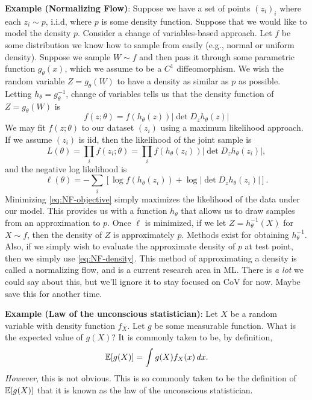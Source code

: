 \vspace{1em} \noindent 
\textbf{Example (Normalizing Flow)}: Suppose we have a set of points $(z_i)_i $ where each $z_i \sim p$, i.i.d, where $p$ is some density function. Suppose that we would like to model the density $p$. Consider a change of variables-based approach. Let $f$ be some distribution we know how to sample from easily (e.g., normal or uniform density). Suppose we sample $W\sim f$ and then pass it through some parametric function $g_\theta(x)$, which we assume to be a $C^1$ diffeomorphism. We wish the random variable $Z=g_\theta(W)$ to have a density as similar as $p$ as possible. Letting $h_\theta = g_\theta^{-1}$, change of variables tells us that the density function of $Z=g_\theta(W)$ is
\begin{equation} \label{eq:NF-density}
f(z;\theta) = f(h_\theta(z)) |\det D_z h_\theta(z)| 
\end{equation}
We may fit $f(z; \theta)$ to our dataset $(z_i)$ using a maximum likelihood approach. If we assume $(z_i)$ is iid, then the likelihood of the joint sample is
\begin{equation} 
L(\theta) = \prod_i f(z_i; \theta)  = \prod_i f(h_\theta(z_i)) |\det D_z h_\theta(z_i)|,
\end{equation}
and the negative log likelihood is
\begin{equation} \label{eq:NF-objective}
\ell(\theta) = -\sum_i \left[ \log f(h_\theta(z_i))  + \log |\det D_z h_\theta(z_i)| \right].
\end{equation}
Minimizing \eqref{eq:NF-objective} simply maximizes the likelihood of the data under our model. This provides us with a function $h_\theta$ that allows us to draw samples from an approximation to $p$. Once $\ell$ is minimized, if we let $Z = h^{-1}_\theta(X)$ for $X\sim f$, then the density of $Z$ is approximately $p$. Methods exist for obtaining $h^{-1}_\theta$. Also, if we simply wish to evaluate the approximate density of $p$ at test point, then we simply use \eqref{eq:NF-density}. This method of approximating a density is called a normalizing flow, and is a current research area in ML. There is \emph{a lot} we could say about this, but we'll ignore it to stay focused on CoV for now. Maybe save this for another time.

\vspace{1em} \noindent
\textbf{Example (Law of the unconscious statistician)}: Let $X$ be a random variable with density function $f_X$. Let $g$ be some measurable function. What is the expected value of $g(X)$? It is commonly taken to be, by definition,
\begin{equation} \label{eq:LOTUS}
\mathbb{E}[g(X)] = \int g(X) f_X(x)\, dx. 
\end{equation}
\emph{However}, this is not obvious. This is so commonly taken to be the definition of $\mathbb{E}[g(X)]$ that it is known as the law of the unconscious statistician. 

